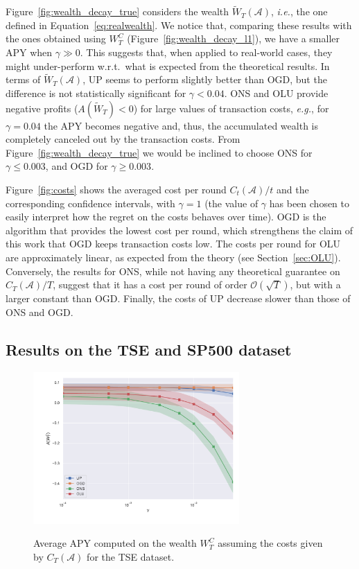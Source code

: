 Figure~\ref{fig:wealth_decay_true} considers the wealth $\tilde{W}_T(\mathcal{A})$, \emph{i.e.}, the one defined in Equation~\eqref{eq:realwealth}.
We notice that, comparing these results with the ones obtained using $W_T^C$ (Figure~\ref{fig:wealth_decay_l1}), we have a smaller APY when $\gamma \gg 0$.
This suggests that, when applied to real-world cases, they might under-perform w.r.t.~what is expected from the theoretical results. 
In terms of $\tilde{W}_T(\mathcal{A})$, UP seems to perform slightly better than OGD, but the difference is not statistically significant for $\gamma < 0.04$.
ONS and OLU provide negative profits ($A(\tilde{W}_T) < 0$) for large values of transaction costs, \emph{e.g.}, for $\gamma = 0.04$ the APY becomes negative and, thus, the accumulated wealth is completely canceled out by the transaction costs.
From Figure~\ref{fig:wealth_decay_true} we would be inclined to choose ONS for $\gamma \leq 0.003$, and OGD for $\gamma \geq 0.003$.

Figure~\ref{fig:costs} shows the averaged cost per round $C_t(\mathcal{A})/t$ and the corresponding confidence intervals, with $\gamma = 1$ (the value of $\gamma$ has been chosen to easily interpret how the regret on the costs behaves over time).
OGD is the algorithm that provides the lowest cost per round, which strengthens the claim of this work that OGD keeps transaction costs low.
The costs per round for OLU are approximately linear, as expected from the theory (see Section~\ref{sec:OLU}).
Conversely, the results for ONS, while not having any theoretical guarantee on $C_T(\mathcal{A})/T$, suggest that it has a cost per round of order $\mathcal{O}(\sqrt{T})$, but with a larger constant than OGD.
Finally, the costs of UP decrease slower than those of ONS and OGD.

\subsection{Results on the TSE and SP500 dataset}

\begin{figure}[ht!]
\centering
{\includegraphics[width=0.70\textwidth,keepaspectratio]{img/fig_w_decay_l1_tse.pdf}} 
\caption{Average APY computed on the wealth $W_T^C$ assuming the costs given by $C_T(\mathcal{A})$ for the TSE dataset.}
\label{fig:wealth_decay_l1_tse}
\end{figure}


